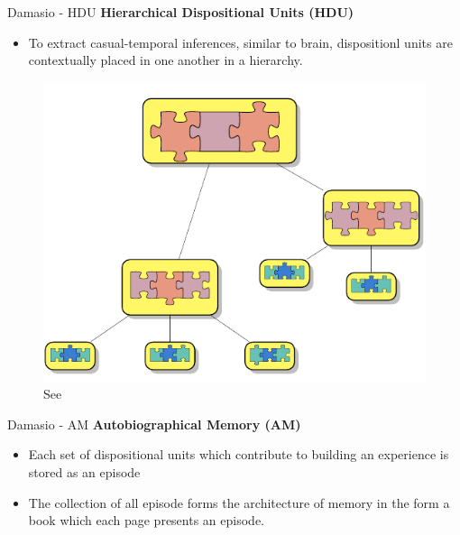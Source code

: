 \documentclass[unknownkeysallowed]{beamer}
\begin{document}
\begin{frame}{Damasio - HDU}
	\textbf{Hierarchical Dispositional Units (HDU)}
	\begin{itemize}
	\item To extract casual-temporal inferences, similar to brain, dispositionl units are contextually placed in one another in a hierarchy.
	\end{itemize}
	\begin{figure}
	\includegraphics[scale=0.3]{regazzoni-2020-multi-sensorial-generative-and-descriptive-self-awareness-models-for-autonomous-systems-fig-3.png}
	\caption{See \cite{regazzoni-2020-multi-sensorial-generative-and-descriptive-self-awareness-models-for-autonomous-systems}}
	\end{figure}
\end{frame}

\begin{frame}{Damasio - AM}
	\textbf{Autobiographical Memory (AM)}
	\begin{itemize}
	\item Each set of dispositional units which contribute to building an experience is stored as an episode
	\item The collection of all episode forms the architecture of memory in the form a book which each page presents an episode. 
	\end{itemize}
\end{frame}
\end{document}
